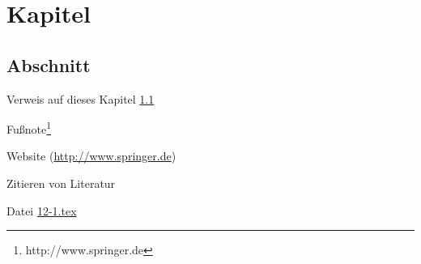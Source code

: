 \documentclass[12pt,a5paper]{scrbook}
\begin{document}
	
	\chapter{Kapitel}
	
	\section{Abschnitt}\label{sec:Abschnitt}
	
	Verweis auf dieses Kapitel \ref{sec:Abschnitt}
	
	Fußnote\footnote{http://www.springer.de}
	
	Website (\url{http://www.springer.de})
	
	Zitieren von Literatur \cite{Ochsner.2015}
	
	Datei \href{run:./12-1.tex}{12-1.tex}
	
\end{document}

